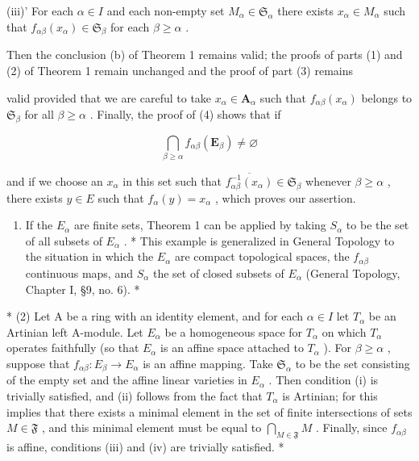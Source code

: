 (iii)' For each \(\alpha \in I\) and each non-empty set \(M_{\alpha} \in \mathfrak{S}_{\alpha}\) there exists \(x_{\alpha} \in M_{\alpha}\) such that \(f_{\alpha \beta}(x_{\alpha}) \in \mathfrak{S}_{\beta}\) for each \(\beta \geqslant \alpha\) .

Then the conclusion (b) of Theorem 1 remains valid; the proofs of parts (1) and (2) of Theorem 1 remain unchanged and the proof of part (3) remains

valid provided that we are careful to take \(x_{\alpha} \in \mathbf{A}_{\alpha}\) such that \(f_{\alpha \beta}(x_{\alpha})\) belongs to \(\mathfrak{S}_{\beta}\) for all \(\beta \geqslant \alpha\) . Finally, the proof of (4) shows that if

\[
\bigcap_ {\beta \geqslant \alpha} f _ {\alpha \beta} (\mathbf {E} _ {\beta}) \neq \varnothing
\]

and if we choose an \(x_{\alpha}\) in this set such that \(\overline{f_{\alpha\beta}^{-1}(x_{\alpha})} \in \mathfrak{S}_{\beta}\) whenever \(\beta \geqslant \alpha\) , there exists \(y \in E\) such that \(f_{\alpha}(y) = x_{\alpha}\) , which proves our assertion.


\begin{enumerate}
\def\labelenumi{(\arabic{enumi})}
\tightlist
\item
  If the \(E_{\alpha}\) are finite sets, Theorem 1 can be applied by taking \(S_{\alpha}\) to be the set of all subsets of \(E_{\alpha}\) . * This example is generalized in General Topology to the situation in which the \(E_{\alpha}\) are compact topological spaces, the \(f_{\alpha\beta}\) continuous maps, and \(S_{\alpha}\) the set of closed subsets of \(E_{\alpha}\) (General Topology, Chapter I, §9, no. 6). *
\end{enumerate}

* (2) Let A be a ring with an identity element, and for each \(\alpha \in I\) let \(T_{\alpha}\) be an Artinian left A-module. Let \(E_{\alpha}\) be a homogeneous space for \(T_{\alpha}\) on which \(T_{\alpha}\) operates faithfully (so that \(E_{\alpha}\) is an affine space attached to \(T_{\alpha}\) ). For \(\beta \geqslant \alpha\) , suppose that \(f_{\alpha \beta}: E_{\beta} \to E_{\alpha}\) is an affine mapping. Take \(\mathfrak{S}_{\alpha}\) to be the set consisting of the empty set and the affine linear varieties in \(E_{\alpha}\) . Then condition (i) is trivially satisfied, and (ii) follows from the fact that \(T_{\alpha}\) is Artinian; for this implies that there exists a minimal element in the set of finite intersections of sets \(M \in \mathfrak{F}\) , and this minimal element must be equal to \(\bigcap_{M \in \mathfrak{F}} M\) . Finally, since \(f_{\alpha \beta}\) is affine, conditions (iii) and (iv) are trivially satisfied. *

